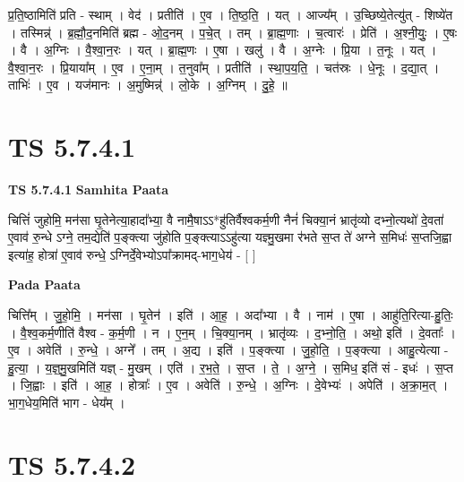 \documentclass[17pt]{extarticle}
\begin{document}
प्र॒ति॒ष्ठामिति॑ प्रति - स्थाम् । वेद॑ । प्रतीति॑ । ए॒व । ति॒ष्ठ॒ति॒ । यत् । आज्य᳚म् । उ॒च्छिष्ये॒तेत्यु॑त् - शिष्ये॑त । तस्मिन्न्॑ । ब्र॒ह्मौ॒द॒नमिति॑ ब्रह्म - ओ॒द॒नम् । प॒चे॒त् । तम् । ब्रा॒ह्म॒णाः । च॒त्वारः॑ । प्रेति॑ । अ॒श्नी॒युः॒ । ए॒षः । वै । अ॒ग्निः । वै॒श्वा॒न॒रः । यत् । ब्रा॒ह्म॒णः । ए॒षा । खलु॑ । वै । अ॒ग्नेः । प्रि॒या । त॒नूः । यत् । वै॒श्वा॒न॒रः । प्रि॒याया᳚म् । ए॒व । ए॒ना॒म् । त॒नुवा᳚म् । प्रतीति॑ । स्था॒प॒य॒ति॒ । चत॑स्रः । धे॒नूः । द॒द्या॒त् । ताभिः॑ । ए॒व । यज॑मानः । अ॒मुष्मिन्न्॑ । लो॒के । अ॒ग्निम् । दु॒हे॒ ॥  \newline





\section{ TS 5.7.4.1 }

\textbf{TS 5.7.4.1 } \newline
\textbf{Samhita Paata} \newline

चित्तिं॑ जुहोमि॒ मन॑सा घृ॒तेनेत्या॒हादा᳚भ्या॒ वै नामै॒षाऽऽ*हु॑तिर्वैश्वकर्म॒णी नैनं॑ चिक्या॒नं भ्रातृ॑व्यो दभ्नो॒त्यथो॑ दे॒वता॑ ए॒वाव॑ रु॒न्धे ऽग्ने॒ तम॒द्येति॑ प॒ङ्क्त्या जु॑होति प॒ङ्क्त्याऽऽहु॑त्या यज्ञ्मु॒खमा र॑भते स॒प्त ते॑ अग्ने स॒मिधः॑ स॒प्तजि॒ह्वा इत्या॑ह॒ होत्रा॑ ए॒वाव॑ रुन्धे॒ ऽग्निर्दे॒वेभ्योऽपा᳚क्रामद्-भाग॒धेय॑ - [  ] \newline

\textbf{Pada Paata} \newline

चित्ति᳚म् । जु॒हो॒मि॒ । मन॑सा । घृ॒तेन॑ । इति॑ । आ॒ह॒ । अदा᳚भ्या । वै । नाम॑ । ए॒षा । आहु॑ति॒रित्या-हु॒तिः॒ । वै॒श्व॒कर्म॒णीति॑ वैश्व - क॒र्म॒णी । न । ए॒न॒म् । चि॒क्या॒नम् । भ्रातृ॑व्यः । द॒भ्नो॒ति॒ । अथो॒ इति॑ । दे॒वताः᳚ । ए॒व । अवेति॑ । रु॒न्धे॒ । अग्ने᳚ । तम् । अ॒द्य । इति॑ । प॒ङ्क्त्या । जु॒हो॒ति॒ । प॒ङ्क्त्या । आहु॒त्येत्या - हु॒त्या॒ । य॒ज्ञ्॒मु॒खमिति॑ यज्ञ् - मु॒खम् । एति॑ । र॒भ॒ते॒ । स॒प्त । ते॒ । अ॒ग्ने॒ । स॒मिध॒ इति॑ सं - इधः॑ । स॒प्त । जि॒ह्वाः । इति॑ । आ॒ह॒ । होत्राः᳚ । ए॒व । अवेति॑ । रु॒न्धे॒ । अ॒ग्निः । दे॒वेभ्यः॑ । अपेति॑ । अ॒क्रा॒म॒त् । भा॒ग॒धेय॒मिति॑ भाग - धेय᳚म् ।  \newline





\section{ TS 5.7.4.2 }
\end{document}
